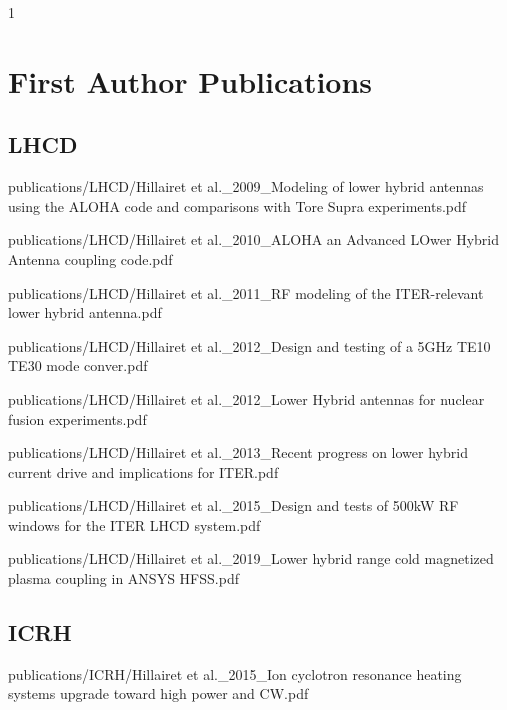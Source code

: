 \documentclass[
fontsize=10pt, %
twoside=true, %
numbers=noenddot, %
]{kaobook}
\def\addpublications{0}
\begin{document}
	\if\addpublications1
	\chapter{First Author Publications}
	
	\section{LHCD}
	
		
		{publications/LHCD/Hillairet et al._2009_Modeling of lower hybrid antennas using the {ALOHA} code and comparisons with Tore Supra experiments.pdf}
		
		
		{publications/LHCD/Hillairet et al._2010_ALOHA an Advanced LOwer Hybrid Antenna coupling code.pdf}
		
		
		{publications/LHCD/Hillairet et al._2011_RF modeling of the ITER-relevant lower hybrid antenna.pdf}
		
		
		{publications/LHCD/Hillairet et al._2012_Design and testing of a 5GHz TE10 TE30 mode conver.pdf}
		
		
		{publications/LHCD/Hillairet et al._2012_Lower Hybrid antennas for nuclear fusion experiments.pdf}
		
		
		{publications/LHCD/Hillairet et al._2013_Recent progress on lower hybrid current drive and implications for ITER.pdf}
		
		
		{publications/LHCD/Hillairet et al._2015_Design and tests of 500kW RF windows for the ITER LHCD system.pdf}
		
		
		{publications/LHCD/Hillairet et al._2019_Lower hybrid range cold magnetized plasma coupling in ANSYS HFSS.pdf}
		
	\section{ICRH}
	
		
		{publications/ICRH/Hillairet et al._2015_Ion cyclotron resonance heating systems upgrade toward high power and CW.pdf}
		
\end{document}
